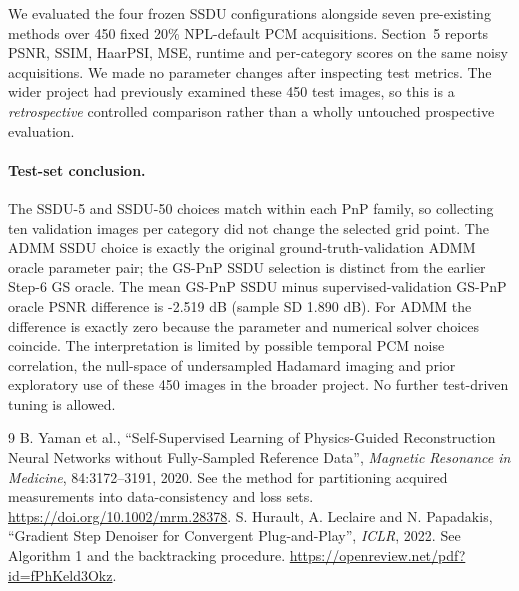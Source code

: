 \documentclass[a4paper,10pt]{article}
\begin{document}
We evaluated the four frozen SSDU configurations alongside seven pre-existing methods over 450 fixed 20\% NPL-default PCM acquisitions. Section~5 reports PSNR, SSIM, HaarPSI, MSE, runtime and per-category scores on the same noisy acquisitions. We made no parameter changes after inspecting test metrics. The wider project had previously examined these 450 test images, so this is a \emph{retrospective} controlled comparison rather than a wholly untouched prospective evaluation.


\paragraph{Test-set conclusion.} The SSDU-5 and SSDU-50 choices match within each
PnP family, so collecting ten validation images per category did not change
the selected grid point. The ADMM SSDU choice is exactly the original
ground-truth-validation ADMM oracle parameter pair; the GS-PnP SSDU
selection is distinct from the earlier Step-6 GS oracle. The mean GS-PnP SSDU minus supervised-validation GS-PnP oracle PSNR difference is -2.519 dB (sample SD 1.890 dB). For ADMM the difference is exactly zero because the parameter and numerical solver choices coincide.
The interpretation is limited by possible temporal PCM noise correlation,
the null-space of undersampled Hadamard imaging and prior exploratory use of
these 450 images in the broader project. No further test-driven tuning is allowed.

\renewcommand{\refname}{Primary references}
\begin{thebibliography}{9}
 B. Yaman et al., ``Self-Supervised Learning of Physics-Guided Reconstruction Neural Networks without Fully-Sampled Reference Data'', \emph{Magnetic Resonance in Medicine}, 84:3172--3191, 2020. See the method for partitioning acquired measurements into data-consistency and loss sets. \url{https://doi.org/10.1002/mrm.28378}.
 S. Hurault, A. Leclaire and N. Papadakis, ``Gradient Step Denoiser for Convergent Plug-and-Play'', \emph{ICLR}, 2022. See Algorithm 1 and the backtracking procedure. \url{https://openreview.net/pdf?id=fPhKeld3Okz}.
\end{thebibliography}
\end{document}
